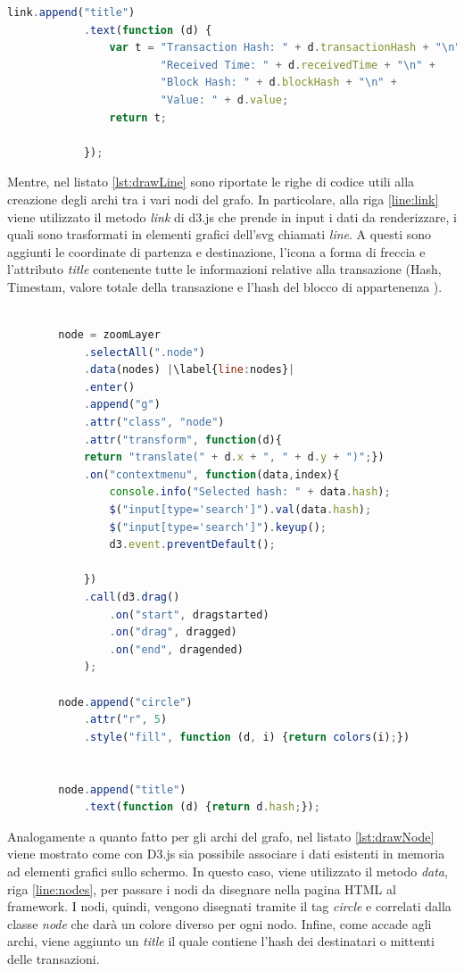 \begin{itemize}
\begin{lstlisting}[language=Javascript, escapechar=|, label=lst:drawLine, caption={Creazione linee.}]
        link.append("title")
            .text(function (d) {
                var t = "Transaction Hash: " + d.transactionHash + "\n" +
                        "Received Time: " + d.receivedTime + "\n" +
                        "Block Hash: " + d.blockHash + "\n" +
                        "Value: " + d.value;
                return t;

            });
\end{lstlisting}


Mentre, nel listato \ref{lst:drawLine} sono riportate le righe di codice utili alla creazione degli archi tra i vari nodi del grafo. In particolare, alla riga \ref{line:link} viene utilizzato il metodo \textit{link} di d3.js che prende in input i dati da renderizzare, i quali sono trasformati in elementi grafici dell'svg chiamati \textit{line}. A questi sono aggiunti le coordinate di partenza e destinazione, l'icona a forma di freccia e l'attributo \textit{title} contenente tutte le informazioni relative alla transazione (Hash, Timestam, valore totale della transazione e l'hash del blocco di appartenenza ).

\begin{lstlisting}[language=Javascript, escapechar=|, label=lst:drawNode, caption={Creazione dei nodi del grafo.}]

        node = zoomLayer
            .selectAll(".node")
            .data(nodes) |\label{line:nodes}|
            .enter()
            .append("g")
            .attr("class", "node")
            .attr("transform", function(d){ 
            return "translate(" + d.x + ", " + d.y + ")";})
            .on("contextmenu", function(data,index){
                console.info("Selected hash: " + data.hash);
                $("input[type='search']").val(data.hash);
                $("input[type='search']").keyup();
                d3.event.preventDefault();

            })
            .call(d3.drag()
                .on("start", dragstarted)
                .on("drag", dragged)
                .on("end", dragended)
            );

        node.append("circle")
            .attr("r", 5)
            .style("fill", function (d, i) {return colors(i);})


        node.append("title")
            .text(function (d) {return d.hash;});
\end{lstlisting}

Analogamente a quanto fatto per gli archi del grafo, nel listato \ref{lst:drawNode} viene mostrato come con D3.js sia possibile associare i dati esistenti in memoria ad elementi grafici sullo schermo. In questo caso, viene utilizzato il metodo \textit{data}, riga \ref{line:nodes}, per passare i nodi da disegnare nella pagina HTML al framework. I nodi, quindi, vengono disegnati tramite il tag \textit{circle} e correlati dalla classe \textit{node} che darà un colore diverso per ogni nodo. Infine, come accade agli archi, viene aggiunto un \textit{title} il quale contiene l'hash dei destinatari o mittenti delle transazioni.
 

\end{itemize}
